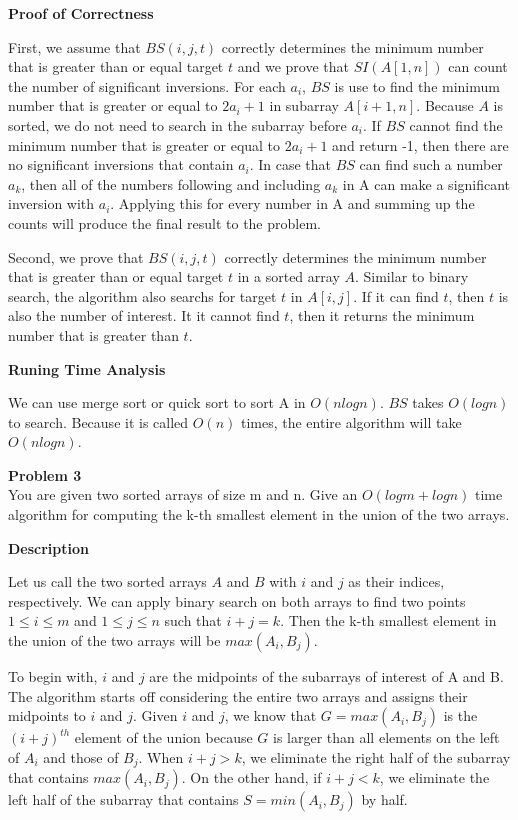\documentclass[12pt,article]{article}
\newenvironment{problem}[2][Problem]
    { \begin{mdframed}[backgroundcolor=gray!20] \textbf{#1 #2} \\}
    {  \end{mdframed}}
\begin{document}
\textbf{Proof of Correctness}

First, we assume that $BS(i,j,t)$ correctly determines the minimum number that is greater than or equal target $t$ and we prove that $SI(A[1,n])$ can count the number of significant inversions. For each $a_i$, $BS$ is use to find the minimum number that is greater or equal to $2a_i + 1$ in subarray $A[i+1,n]$. Because $A$ is sorted, we do not need to search in the subarray before $a_i$. If $BS$ cannot find the minimum number that is greater or equal to $2a_i + 1$ and return -1, then there are no significant inversions that contain $a_i$. In case that $BS$ can find such a number $a_k$, then all of the numbers following and including $a_k$ in A can make a significant inversion with $a_i$. Applying this for every number in A and summing up the counts will produce the final result to the problem.

Second, we prove that $BS(i,j,t)$ correctly determines the minimum number that is greater than or equal target $t$ in a sorted array $A$. Similar to binary search, the algorithm also searchs for target $t$ in $A[i,j]$. If it can find $t$, then $t$ is also the number of interest. It it cannot find $t$, then it returns the minimum number that is greater than $t$. 

\textbf{Runing Time Analysis}

We can use merge sort or quick sort to sort A in $O(nlogn)$. $BS$ takes $O(logn)$ to search. Because it is called $O(n)$ times, the entire algorithm will take $O(nlogn)$.
\newpage
\begin{problem}{3} 
You are given two sorted arrays of size m and n. Give an $O(logm + logn)$ time algorithm for computing the k-th smallest element in the union of the two arrays.
\end{problem}

\textbf{Description}

Let us call the two sorted arrays $A$ and $B$ with $i$ and $j$ as their indices, respectively. We can apply binary search on both arrays to find two points $1 \leq i \leq m$ and $1 \leq j \leq n$ such that $i + j = k$. Then the k-th smallest element in the union of the two arrays will be $max(A_i,B_j)$.

To begin with, $i$ and $j$ are the midpoints of the subarrays of interest of A and B. The algorithm starts off considering the entire two arrays and assigns their midpoints to $i$ and $j$. Given $i$ and $j$, we know that $G = max(A_i,B_j)$ is the $(i+j)^{th}$ element of the union because $G$ is larger than all elements on the left of $A_i$ and those of $B_j$. When $i + j > k$, we eliminate the right half of the subarray that contains $max(A_i,B_j)$. On the other hand, if $i+j < k$, we eliminate the left half of the subarray that contains $S = min(A_i,B_j)$ by half. 
\end{document}
